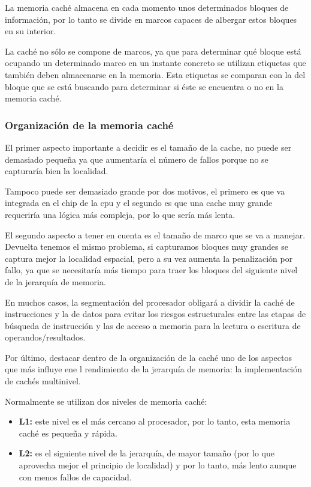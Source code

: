 La memoria caché almacena en cada momento unos determinados bloques de información, por lo tanto se divide en marcos capaces de albergar estos bloques en su interior.

La caché no sólo se compone de marcos, ya que para determinar qué bloque está ocupando un determinado marco en un instante concreto se utilizan etiquetas que también deben almacenarse en la memoria. Esta etiquetas se comparan con la del bloque que se está buscando para determinar si éste se encuentra o no en la memoria caché.

\subsubsection*{Organización de la memoria caché}

El primer aspecto importante a decidir es el tamaño de la cache, no puede ser demasiado pequeña ya que aumentaría el número de fallos porque no se capturaría bien la localidad. 

Tampoco puede ser demasiado grande por dos motivos, el primero es que va integrada en el chip de la cpu y el segundo es que una cache muy grande requeriría una lógica más compleja, por lo que sería más lenta.

El segundo aspecto a tener en cuenta es el tamaño de marco que se va a manejar. Devuelta tenemos el mismo problema, si capturamos bloques muy grandes se captura mejor la localidad espacial, pero a su vez aumenta la penalización por fallo, ya que se necesitaría más tiempo para traer los bloques del siguiente nivel de la jerarquía de memoria.

En muchos casos, la segmentación del procesador obligará a dividir la caché de instrucciones y la de datos para evitar los riesgos estructurales entre las etapas de búsqueda de instrucción y las de acceso a memoria para la lectura o escritura de operandos/resultados.

Por último, destacar dentro de la organización de la caché uno de los aspectos que más influye ene l rendimiento de la jerarquía de memoria: la implementación de cachés multinivel.

Normalmente se utilizan dos niveles de memoria caché:

\begin{itemize}
  \item \textbf{L1:} este nivel es el más cercano al procesador, por lo tanto, esta memoria caché es pequeña y rápida.
  \item \textbf{L2:} es el siguiente nivel de la jerarquía, de mayor tamaño (por lo que aprovecha mejor el principio de localidad) y por lo tanto, más lento aunque con menos fallos de capacidad.
\end{itemize}

